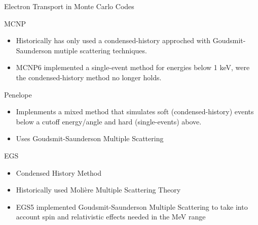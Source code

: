 \documentclass{beamer}
\begin{document}
\begin{frame}{Electron Transport in Monte Carlo Codes}

  \begin{block}{MCNP}
    \begin{itemize}
      \item Historically has only used a condensed-history approched with Goudsmit-Saunderson mutiple scattering techniques.
      \item MCNP6 implemented a single-event method for energies below 1 keV, 
              were the condensed-history method no longer holds.
    \end{itemize}
  \end{block}
    
  \begin{block}{Penelope}
    \begin{itemize}
      \item Implenments a mixed method that simulates soft (condensed-history) 
              events below a cutoff energy/angle and hard (single-events) above.
      \item Uses Goudsmit-Saunderson Multiple Scattering
    \end{itemize}    
  \end{block}

  \begin{block}{EGS}
    \begin{itemize}
      \item Condensed History Method
      \item Historically used Moli\`ere Multiple Scattering Theory
      \item EGS5 implemented Goudsmit-Saunderson Multiple Scattering to take into account spin and relativistic effects needed in the MeV range
    \end{itemize}    
  \end{block}
    

\end{frame}
\end{document}
